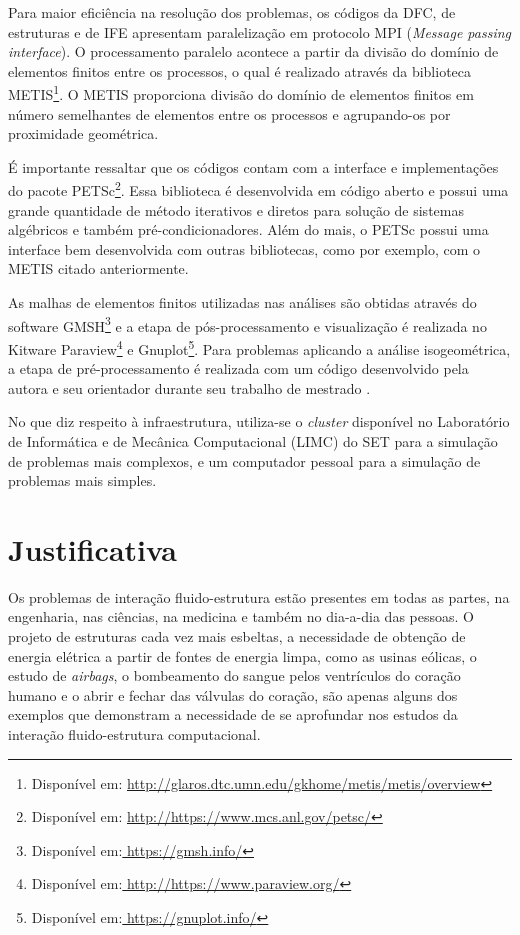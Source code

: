 \documentclass[tese_patricia.tex]{subfiles}
\begin{document}
Para maior eficiência na resolução dos problemas, os códigos da DFC, de estruturas e de IFE apresentam paralelização em protocolo MPI (\textit{Message passing interface}). O processamento paralelo acontece a partir da divisão do domínio de elementos finitos entre os processos, o qual é realizado através da biblioteca METIS\footnote{Disponível em: \url{http://glaros.dtc.umn.edu/gkhome/metis/metis/overview}}. O METIS proporciona divisão do domínio de elementos finitos em número semelhantes de elementos entre os processos e agrupando-os por proximidade geométrica.

É importante ressaltar que os códigos contam com a interface e implementações do pacote PETSc\footnote{Disponível em: \url{http://https://www.mcs.anl.gov/petsc/}}. Essa biblioteca é desenvolvida em código aberto e possui uma grande quantidade de método iterativos e diretos para solução de sistemas algébricos e também pré-condicionadores. Além do mais, o PETSc possui uma interface bem desenvolvida com outras bibliotecas, como por exemplo, com o METIS citado anteriormente. 

As malhas de elementos finitos utilizadas nas análises são obtidas através do software GMSH\footnote{Disponível em:\url{ https://gmsh.info/}} e a etapa de pós-processamento e visualização é realizada no Kitware Paraview\footnote{Disponível em:\url{ http://https://www.paraview.org/}} e  Gnuplot\footnote{Disponível em:\url{ https://gnuplot.info/}}. Para problemas aplicando a análise isogeométrica, a etapa de pré-processamento é realizada com um código desenvolvido pela autora e seu orientador durante seu trabalho de mestrado \cite{Tonon:2016}.

No que diz respeito à infraestrutura, utiliza-se o \textit{cluster} disponível no Laboratório de Informática e de Mecânica Computacional (LIMC) do SET para a simulação de problemas mais complexos, e um computador pessoal para a simulação de problemas mais simples.


 \section[Justificativa]{Justificativa}

Os problemas de interação fluido-estrutura estão presentes em todas as partes, na engenharia, nas ciências, na medicina e também no dia-a-dia das pessoas.
O projeto de estruturas cada vez mais esbeltas, a necessidade de obtenção de energia elétrica a partir de fontes de energia limpa, como as usinas eólicas, o estudo de \textit{airbags}, o bombeamento do sangue pelos ventrículos do coração humano e o abrir e fechar das válvulas do coração, são apenas alguns dos exemplos que demonstram a necessidade de se aprofundar nos estudos da interação fluido-estrutura computacional.
\end{document}
